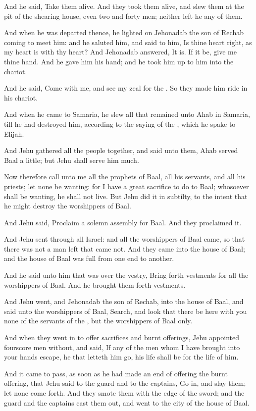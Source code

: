 \Verse And he said, Take them alive. And they took them alive, and slew them at the pit of the shearing house, even two and forty men; neither left he any of them.

\Verse And when he was departed thence, he lighted on Jehonadab the son of Rechab coming to meet him: and he saluted him, and said to him, Is thine heart right, as my heart is with thy heart? And Jehonadab answered, It is. If it be, give me thine hand. And he gave him his hand; and he took him up to him into the chariot.

\Verse And he said, Come with me, and see my zeal for the \LORD. So they made him ride in his chariot.

\Verse And when he came to Samaria, he slew all that remained unto Ahab in Samaria, till he had destroyed him, according to the saying of the \LORD, which he spake to Elijah.

\Verse And Jehu gathered all the people together, and said unto them, Ahab served Baal a little; but Jehu shall serve him much.

\Verse Now therefore call unto me all the prophets of Baal, all his servants, and all his priests; let none be wanting: for I have a great sacrifice to do to Baal; whosoever shall be wanting, he shall not live. But Jehu did it in subtilty, to the intent that he might destroy the worshippers of Baal.

\Verse And Jehu said, Proclaim a solemn assembly for Baal. And they proclaimed it.

\Verse And Jehu sent through all Israel: and all the worshippers of Baal came, so that there was not a man left that came not. And they came into the house of Baal; and the house of Baal was full from one end to another.

\Verse And he said unto him that was over the vestry, Bring forth vestments for all the worshippers of Baal. And he brought them forth vestments.

\Verse And Jehu went, and Jehonadab the son of Rechab, into the house of Baal, and said unto the worshippers of Baal, Search, and look that there be here with you none of the servants of the \LORD, but the worshippers of Baal only.

\Verse And when they went in to offer sacrifices and burnt offerings, Jehu appointed fourscore men without, and said, If any of the men whom I have brought into your hands escape, he that letteth him go, his life shall be for the life of him.

\Verse And it came to pass, as soon as he had made an end of offering the burnt offering, that Jehu said to the guard and to the captains, Go in, and slay them; let none come forth. And they smote them with the edge of the sword; and the guard and the captains cast them out, and went to the city of the house of Baal.

